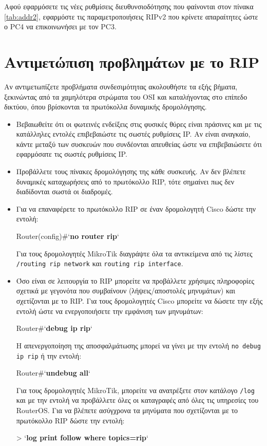 \documentclass{EdipyLabs} %
\begin{document}
Αφού εφαρμόσετε τις νέες ρυθμίσεις διευθυνσιοδότησης που φαίνονται στον πίνακα \ref{tab:addr2}, εφαρμόστε τις παραμετροποιήσεις RIPv2 που κρίνετε απαραίτητες ώστε ο PC4 να επικοινωνήσει με τον PC3.
\newpage

\section{Αντιμετώπιση προβλημάτων με το RIP}
Αν αντιμετωπίζετε προβλήματα συνδεσιμότητας ακολουθήστε τα εξής βήματα, ξεκινώντας από τα χαμηλότερα στρώματα του OSI και καταλήγοντας στο επίπεδο δικτύου, όπου βρίσκονται τα πρωτόκολλα δυναμικής δρομολόγησης.
\begin{itemize}
	\item Βεβαιωθείτε ότι οι φωτεινές ενδείξεις στις φυσικές θύρες είναι πράσινες και με τις κατάλληλες εντολές επιβεβαιώστε τις σωστές ρυθμίσεις IP. Aν είναι αναγκαίο, κάντε  μεταξύ των συσκευών που συνδέονται απευθείας ώστε να επιβεβαιώσετε ότι εφαρμόσατε τις σωστές ρυθμίσεις IP.
	\item Προβάλλετε τους πίνακες δρομολόγησης της κάθε συσκευής. Αν δεν βλέπετε δυναμικές καταχωρήσεις από το πρωτόκολλο RIP, τότε σημαίνει πως δεν διαδίδονται σωστά οι διαδρομές.
	\item Για να επαναφέρετε το πρωτόκολλο RIP σε έναν δρομολογητή Cisco δώστε την εντολή:
\begin{CommandBox}
Router(config)#`\textbf{no router rip}`
\end{CommandBox}
	Για τους δρομολογητές MikroTik διαγράψτε όλα τα αντικείμενα από τις λίστες \texttt{/routing rip network} και \texttt{routing rip interface}. 
	\item Όσο είναι σε λειτουργία το RIP μπορείτε να προβάλλετε χρήσιμες πληροφορίες σχετικά με γεγονότα που συμβαίνουν (λήψεις/αποστολές μηνυμάτων) και σχετίζονται με το RIP. Για τους δρομολογητές Cisco μπορείτε να δώσετε την εξής εντολή ώστε να ενεργοποιήσετε την εμφάνιση των μηνυμάτων: 
\begin{CommandBox}
Router#`\textbf{debug ip rip}`
\end{CommandBox}
	Η απενεργοποίηση της αποσφαλμάτωσης μπορεί να γίνει με την εντολή \texttt{no debug ip rip} ή την εντολή:
\begin{CommandBox}
Router#`\textbf{undebug all}`
\end{CommandBox}
	Για τους δρομολογητές MikroTik, μπορείτε να ανατρέξετε στον κατάλογο \texttt{/log} και με την εντολή  να προβάλλετε όλες οι καταγραφές από όλες τις υπηρεσίες του RouterOS. Για να βλέπετε ασύγχρονα τα μηνύματα που σχετίζονται με το πρωτόκολλο RIP δώστε την εντολή:		
\begin{CommandBox}
 > `\textbf{log print follow where topics=rip}`
\end{CommandBox}
	
\end{itemize}
\end{document}
